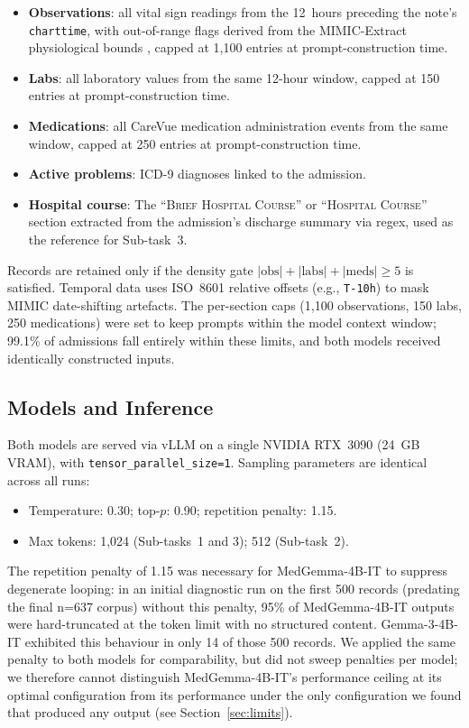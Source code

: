 \documentclass[sigconf,anonymous=false,review=false]{acmart}
\newcommand{\medgemma}{MedGemma-4B-IT\xspace}
\newcommand{\gemma}{Gemma-3-4B-IT\xspace}
\begin{document}
\begin{itemize}
  \item \textbf{Observations}: all vital sign readings from the 12~hours
    preceding the note's \texttt{charttime}, with out-of-range flags derived
    from the MIMIC-Extract physiological bounds \cite{wang2020mimic},
    capped at 1,100 entries at prompt-construction time.
  \item \textbf{Labs}: all laboratory values from the same 12-hour window,
    capped at 150 entries at prompt-construction time.
  \item \textbf{Medications}: all CareVue medication administration events
    from the same window, capped at 250 entries at prompt-construction time.
  \item \textbf{Active problems}: ICD-9 diagnoses linked to the admission.
  \item \textbf{Hospital course}: The ``\textsc{Brief Hospital Course}'' or
    ``\textsc{Hospital Course}'' section extracted from the admission's
    discharge summary via regex, used as the reference for Sub-task~3.
\end{itemize}

Records are retained only if the density gate $|\text{obs}| + |\text{labs}| +
|\text{meds}| \geq 5$ is satisfied. Temporal data uses ISO~8601 relative
offsets (e.g., \texttt{T-10h}) to mask MIMIC date-shifting artefacts.
The per-section caps (1,100 observations, 150 labs, 250 medications) were
set to keep prompts within the model context window; 99.1\% of admissions
fall entirely within these limits, and both models received identically
constructed inputs.

\subsection{Models and Inference}

Both models are served via vLLM \cite{kwon2023efficient} on a single NVIDIA
RTX~3090 (24~GB VRAM), with \texttt{tensor\_parallel\_size=1}. Sampling
parameters are identical across all runs:

\begin{itemize}
  \item Temperature: 0.30; top-$p$: 0.90; repetition penalty: 1.15.
  \item Max tokens: 1,024 (Sub-tasks~1 and 3); 512 (Sub-task~2).
\end{itemize}

The repetition penalty of 1.15 was necessary for \medgemma to suppress
degenerate looping: in an initial diagnostic run on the first 500 records
(predating the final n=637 corpus) without this penalty, 95\% of
\medgemma outputs were hard-truncated at the token limit with no structured
content. \gemma exhibited this behaviour in only 14 of those 500 records.
We applied the same penalty to both models for comparability, but did not
sweep penalties per model; we therefore cannot distinguish \medgemma's
performance ceiling at its optimal configuration from its performance under
the only configuration we found that produced any output (see
Section~\ref{sec:limits}).
\end{document}
